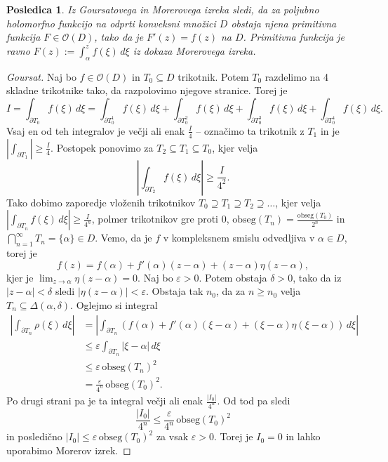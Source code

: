\documentclass[10pt, a4paper]{article}
\newtheorem{posledica}[izr]{Posledica}
\newenvironment{noticeC}{%
  \tcolorbox[%
  notitle,
  empty,
  enhanced,  %
  breakable,
  coltext=black, 
  fontupper=\rmfamily,
  parbox=false,
  noparskip,
  sharp corners,
  boxrule=-1pt,  %
  frame hidden,
  left=7pt,  %
  right=7pt,
  top=5pt,
  bottom=5pt,
  before skip=2.5ex plus 2pt,
  after skip=2.5ex plus 2pt,
  overlay unbroken and last={%
  },
  ]}
{\endtcolorbox}
\newenvironment{dokaz}%
  {\begin{noticeC}\begin{proof}}%
  {\end{proof}\end{noticeC}}
\begin{document}
\begin{posledica}
  Iz Goursatovega in Morerovega izreka sledi, da za poljubno holomorfno funkcijo 
  na odprti konveksni množici $D$ obstaja njena primitivna funkcija $F \in \mathcal{O}(D)$,
  tako da je $F'(z) = f(z)$ na $D$. Primitivna funkcija je ravno $F(z) := \int_\alpha ^z f(\xi)\, d\xi$
  iz dokaza Morerovega izreka.
\end{posledica}

\begin{dokaz}[Goursat]
  Naj bo $f \in \mathcal{O} (D)$ in $T_0 \subseteq D$ trikotnik.
  Potem $T_0$ razdelimo na 4 skladne trikotnike tako, da razpolovimo njegove stranice.
  Torej je 
  $$I = \int_{\partial T_0} f(\xi)\, d\xi = \int_{\partial T_0 ^1} f(\xi)\, d\xi + \int_{\partial T_0 ^2} f(\xi)\, d\xi + \int_{\partial T_0 ^3} f(\xi)\, d\xi + \int_{\partial T_0 ^4} f(\xi)\, d\xi.$$
  Vsaj en od teh integralov je večji ali enak $\frac{I}{4}$ -- označimo ta trikotnik z $T_1$ in 
  je $\left|\int_{\partial T_1}\right| \geq \frac{I}{4}$.
  Postopek ponovimo za $T_2 \subseteq T_1 \subseteq T_0$, kjer velja 
  $$\left| \int_{\partial T_2} f(\xi)\, d\xi\right| \geq \frac{I}{4^2}.$$
  Tako dobimo zaporedje vloženih trikotnikov $T_0 \supseteq T_1 \supseteq T_2 \supseteq \dots$,
  kjer velja $\left| \int_{\partial T_n} f(\xi)\, d\xi\right| \geq \frac{I}{4^n}$,
  polmer trikotnikov gre proti $0$, $\mathrm{obseg} (T_n) = \frac{\mathrm{obseg} (T_0)}{2^n}$
  in $\bigcap_{n = 1} ^\infty T_n = \{\alpha\} \in D$.
  Vemo, da je $f$ v kompleksnem smislu odvedljiva v $\alpha \in D$, 
  torej je 
  $$f(z) = f(\alpha) + f'(\alpha) (z - \alpha) + (z - \alpha) \eta (z - \alpha),$$
  kjer je $\lim_{z \to \alpha} \eta (z - \alpha) = 0.$ Naj bo $\varepsilon > 0$.
  Potem obstaja $\delta > 0$, tako da iz $|z - \alpha| < \delta$
  sledi $|\eta (z - \alpha)| < \varepsilon$.
  Obstaja tak $n_0$, da za $n \geq n_0$ velja $T_n \subseteq \Delta (\alpha, \delta)$.
  Oglejmo si integral 
  \begin{align*}
    \left| \int_{\partial T_n} \rho (\xi)\, d\xi \right| &= \left| \int_{\partial T_n} (f(\alpha) + f'(\alpha) (\xi - \alpha) + (\xi - \alpha) \eta (\xi - \alpha))\, d\xi \right|\\
    &\leq \varepsilon \int_{\partial T_n} |\xi - \alpha|\, d\xi\\
    &\leq \varepsilon\, \mathrm{obseg} (T_n) ^2\\
    &= \frac{\varepsilon}{4^n}\, \mathrm{obseg} (T_0) ^2.
  \end{align*}
  Po drugi strani pa je ta integral večji ali enak $\frac{|I_0|}{4^n}$.
  Od tod pa sledi $$\frac{|I_0|}{4^n} \leq \frac{\varepsilon}{4^n}\, \mathrm{obseg} (T_0) ^2$$
  in posledično $|I_0| \leq \varepsilon\, \mathrm{obseg} (T_0) ^2$ za vsak $\varepsilon > 0$.
  Torej je $I_0 = 0$ in lahko uporabimo Morerov izrek.
\end{dokaz}
\end{document}
